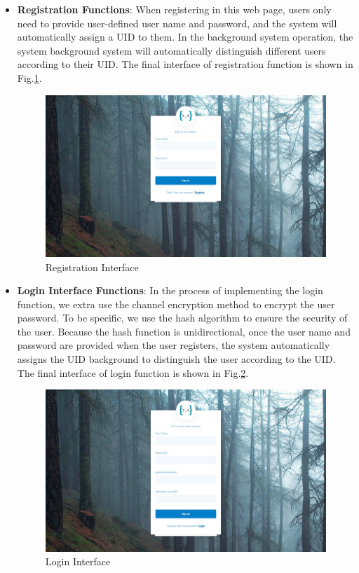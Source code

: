\begin{itemize}
    \item \textbf{Registration Functions}: When registering in this web page, users only need to provide user-defined user name and password, and the system will automatically assign a UID to them. In the background system operation, the system background system will automatically distinguish different users according to their UID. The final interface of registration function is shown in Fig.\ref{register}.
    
    \begin{figure}[H]
     \centering
     \includegraphics[width=.8\textwidth]{signinui.jpeg} 
     \caption{Registration Interface}
     \label{register}
     \end{figure}
    
    \item \textbf{Login Interface Functions}: In the process of implementing the login function, we extra use the channel encryption method to encrypt the user password. To be specific, we use the hash algorithm to ensure the security of the user. Because the hash function is unidirectional, once the user name and password are provided when the user registers, the system automatically assigns the UID background to distinguish the user according to the UID. The final interface of login function is shown in Fig.\ref{login}.
    
      \begin{figure}[H]
     \centering
     \includegraphics[width=.8\textwidth]{loginui.jpeg}
     \caption{Login Interface}
     \label{login}
     \vspace{-1em}
     \end{figure}
     

\end{itemize}
